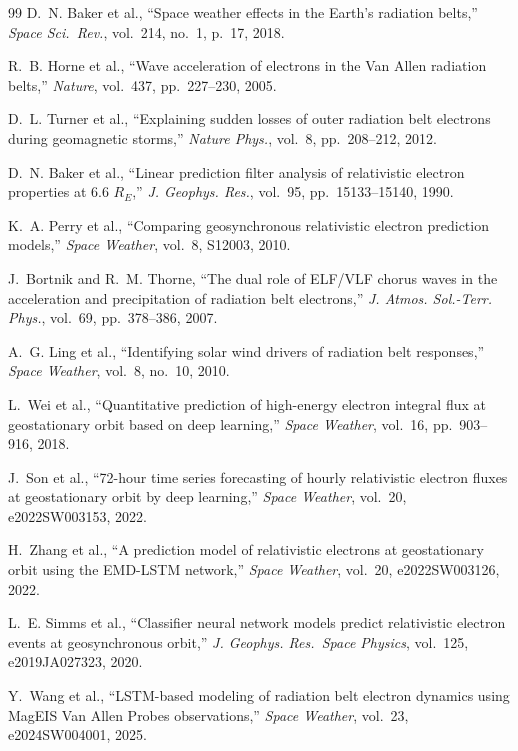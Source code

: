 \documentclass{ieeeaccess}
\begin{document}
\begin{thebibliography}{99}
D.~N. Baker et al., ``Space weather effects in the Earth's radiation belts,''
\emph{Space Sci.\ Rev.}, vol.~214, no.~1, p.~17, 2018.

R.~B. Horne et al., ``Wave acceleration of electrons in the Van Allen
radiation belts,'' \emph{Nature}, vol.~437, pp.~227--230, 2005.

D.~L. Turner et al., ``Explaining sudden losses of outer radiation belt
electrons during geomagnetic storms,'' \emph{Nature Phys.}, vol.~8,
pp.~208--212, 2012.

D.~N. Baker et al., ``Linear prediction filter analysis of relativistic
electron properties at 6.6 \(R_E\),'' \emph{J. Geophys. Res.}, vol.~95,
pp.~15133--15140, 1990.

K.~A. Perry et al., ``Comparing geosynchronous relativistic electron
prediction models,'' \emph{Space Weather}, vol.~8, S12003, 2010.

J.~Bortnik and R.~M. Thorne, ``The dual role of ELF/VLF chorus waves in
the acceleration and precipitation of radiation belt electrons,''
\emph{J. Atmos. Sol.-Terr. Phys.}, vol.~69, pp.~378--386, 2007.

A.~G. Ling et al., ``Identifying solar wind drivers of radiation belt
responses,'' \emph{Space Weather}, vol.~8, no.~10, 2010.

L.~Wei et al., ``Quantitative prediction of high-energy electron integral
flux at geostationary orbit based on deep learning,'' \emph{Space Weather},
vol.~16, pp.~903--916, 2018.

J.~Son et al., ``72-hour time series forecasting of hourly relativistic
electron fluxes at geostationary orbit by deep learning,''
\emph{Space Weather}, vol.~20, e2022SW003153, 2022.

H.~Zhang et al., ``A prediction model of relativistic electrons at
geostationary orbit using the EMD-LSTM network,'' \emph{Space Weather},
vol.~20, e2022SW003126, 2022.

L.~E. Simms et al., ``Classifier neural network models predict relativistic
electron events at geosynchronous orbit,'' \emph{J. Geophys. Res.\
Space Physics}, vol.~125, e2019JA027323, 2020.

Y.~Wang et al., ``LSTM-based modeling of radiation belt electron dynamics
using MagEIS Van Allen Probes observations,'' \emph{Space Weather}, vol.~23,
e2024SW004001, 2025.


\end{thebibliography}
\end{document}
